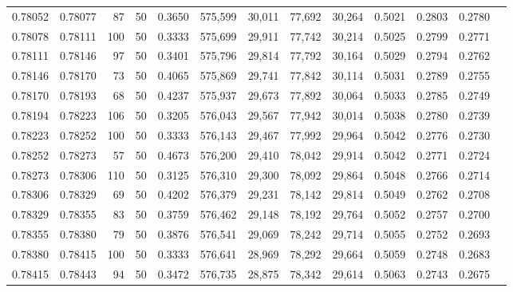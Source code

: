 \begin{tabular}{rrrrrrrrrrrrr}
0.78052 & 0.78077 &    87 &  50 &                                     0.3650 & 575,599 &  30,011 &  77,692 &  30,264 & 0.5021 & 0.2803 & 0.2780 \\
0.78078 & 0.78111 &   100 &  50 &                                     0.3333 & 575,699 &  29,911 &  77,742 &  30,214 & 0.5025 & 0.2799 & 0.2771 \\
0.78111 & 0.78146 &    97 &  50 &                                     0.3401 & 575,796 &  29,814 &  77,792 &  30,164 & 0.5029 & 0.2794 & 0.2762 \\
0.78146 & 0.78170 &    73 &  50 &                                     0.4065 & 575,869 &  29,741 &  77,842 &  30,114 & 0.5031 & 0.2789 & 0.2755 \\
0.78170 & 0.78193 &    68 &  50 &                                     0.4237 & 575,937 &  29,673 &  77,892 &  30,064 & 0.5033 & 0.2785 & 0.2749 \\
0.78194 & 0.78223 &   106 &  50 &                                     0.3205 & 576,043 &  29,567 &  77,942 &  30,014 & 0.5038 & 0.2780 & 0.2739 \\
0.78223 & 0.78252 &   100 &  50 &                                     0.3333 & 576,143 &  29,467 &  77,992 &  29,964 & 0.5042 & 0.2776 & 0.2730 \\
0.78252 & 0.78273 &    57 &  50 &                                     0.4673 & 576,200 &  29,410 &  78,042 &  29,914 & 0.5042 & 0.2771 & 0.2724 \\
0.78273 & 0.78306 &   110 &  50 &                                     0.3125 & 576,310 &  29,300 &  78,092 &  29,864 & 0.5048 & 0.2766 & 0.2714 \\
0.78306 & 0.78329 &    69 &  50 &                                     0.4202 & 576,379 &  29,231 &  78,142 &  29,814 & 0.5049 & 0.2762 & 0.2708 \\
0.78329 & 0.78355 &    83 &  50 &                                     0.3759 & 576,462 &  29,148 &  78,192 &  29,764 & 0.5052 & 0.2757 & 0.2700 \\
0.78355 & 0.78380 &    79 &  50 &                                     0.3876 & 576,541 &  29,069 &  78,242 &  29,714 & 0.5055 & 0.2752 & 0.2693 \\
0.78380 & 0.78415 &   100 &  50 &                                     0.3333 & 576,641 &  28,969 &  78,292 &  29,664 & 0.5059 & 0.2748 & 0.2683 \\
0.78415 & 0.78443 &    94 &  50 &                                     0.3472 & 576,735 &  28,875 &  78,342 &  29,614 & 0.5063 & 0.2743 & 0.2675 \\

\end{tabular}
